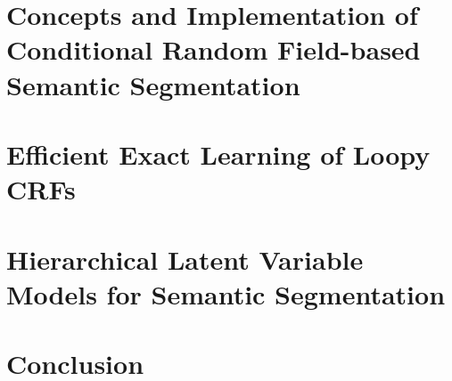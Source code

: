 \documentclass[12pt,toc=bibnumbered, a4paper,twoside]{scrreprt}
\begin{document}
\chapter{Concepts and Implementation of Conditional Random Field-based Semantic Segmentation}



\chapter{Efficient Exact Learning of Loopy CRFs}



\chapter{Hierarchical Latent Variable Models for Semantic Segmentation}

\cite{li2010object}

\chapter{Conclusion}



\end{document}
